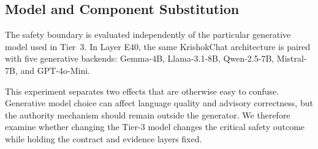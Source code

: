 \documentclass[a4paper,fleqn]{cas-dc}
\begin{document}
\begin{table}[pos=t]
\centering
\caption{Canonical baseline ladder used across evaluation layers. Not every layer instantiates every system; each table specifies its exact evaluated subset. B6 is the proposed contribution.}
\label{tab:baseline_taxonomies}
\small
{}
\end{table}

\subsection{Model and Component Substitution}

The safety boundary is evaluated independently of the particular generative model used in Tier~3. In Layer E40, the same KrishokChat architecture is paired with five generative backends: Gemma-4B, Llama-3.1-8B, Qwen-2.5-7B, Mistral-7B, and GPT-4o-Mini.

This experiment separates two effects that are otherwise easy to confuse. Generative model choice can affect language quality and advisory correctness, but the authority mechanism should remain outside the generator. We therefore examine whether changing the Tier-3 model changes the critical safety outcome while holding the contract and evidence layers fixed.
\end{document}
